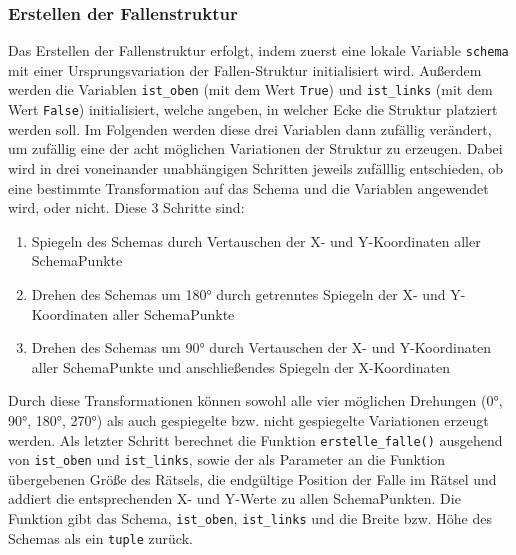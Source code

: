 \subsubsection{Erstellen der Fallenstruktur}
\begin{flushleft}
      Das Erstellen der Fallenstruktur erfolgt, indem zuerst eine lokale Variable \texttt{schema} mit einer Ursprungsvariation der Fallen-Struktur initialisiert wird.
      \linebreak
      \linebreak
      Außerdem werden die Variablen \texttt{ist\_oben} (mit dem Wert \texttt{True}) und \texttt{ist\_links} (mit dem Wert \texttt{False}) initialisiert, welche angeben, in welcher Ecke die Struktur platziert werden soll.
      \linebreak
      \linebreak
      Im Folgenden werden diese drei Variablen dann zufällig verändert, um zufällig eine der acht möglichen Variationen der Struktur zu erzeugen.
      Dabei wird in drei voneinander unabhängigen Schritten jeweils zufälllig entschieden, ob eine bestimmte Transformation auf das Schema und die Variablen angewendet wird, oder nicht.
      \linebreak
      \linebreak
      Diese 3 Schritte sind:
      \begin{enumerate}
            \item Spiegeln des Schemas durch Vertauschen der X- und Y-Koordinaten aller SchemaPunkte
            \item Drehen des Schemas um 180° durch getrenntes Spiegeln der X- und Y-Koordinaten aller SchemaPunkte
            \item Drehen des Schemas um 90° durch Vertauschen der X- und Y-Koordinaten aller SchemaPunkte und anschließendes Spiegeln der X-Koordinaten
      \end{enumerate}
      Durch diese Transformationen können sowohl alle vier möglichen Drehungen (0°, 90°, 180°, 270°) als auch gespiegelte bzw. nicht gespiegelte Variationen erzeugt werden.
      \linebreak
      \linebreak
      Als letzter Schritt berechnet die Funktion \texttt{erstelle\_falle()} ausgehend von \texttt{ist\_oben} und \texttt{ist\_links}, sowie der als Parameter an die Funktion übergebenen Größe des Rätsels, die endgültige Position der Falle im Rätsel und addiert die entsprechenden X- und Y-Werte zu allen SchemaPunkten.
      \linebreak
      \linebreak
      Die Funktion gibt das Schema, \texttt{ist\_oben}, \texttt{ist\_links} und die Breite bzw. Höhe des Schemas als ein \texttt{tuple} zurück.
\end{flushleft}

